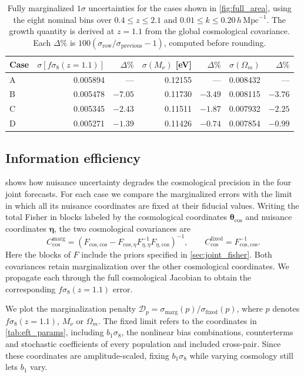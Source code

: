 \documentclass[a4paper,11pt]{article}
\newcommand{\revchange}[1]{{\color{RevisionColor}#1}}
\newcommand{\Om}{\Omega_m}
\def\iMpch{\,h\,\mathrm{Mpc}^{-1}}
\newcommand{\se}{\ensuremath{\sigma_{8}}\xspace}
\newcommand{\Mnu}{M_\nu}
\begin{document}
\begin{table}[t]
\centering\color{RevisionColor}
\small
\setlength{\tabcolsep}{5pt}
\begin{tabular}{lrrrrrr}
\hline
Case & $\sigma[f\se(z=1.1)]$ & $\Delta\%$ & $\sigma(\Mnu)$ [eV] & $\Delta\%$ & $\sigma(\Om)$ & $\Delta\%$ \\
\hline
A & 0.005894 & --- & 0.12155 & --- & 0.008432 & --- \\
B & 0.005478 & $-7.05$ & 0.11730 & $-3.49$ & 0.008115 & $-3.76$ \\
C & 0.005345 & $-2.43$ & 0.11511 & $-1.87$ & 0.007932 & $-2.25$ \\
D & 0.005271 & $-1.39$ & 0.11426 & $-0.74$ & 0.007854 & $-0.99$ \\
\hline
\end{tabular}
\caption{\color{RevisionColor}Fully marginalized $1\sigma$ uncertainties for the
cases shown in \cref{fig:full_area}, using the eight nominal
bins over $0.4\leq z\leq2.1$ and
$0.01\leq k\leq0.20\iMpch$. The growth quantity is derived
at $z=1.1$ from the global cosmological covariance.
Each $\Delta\%$ is $100(\sigma_{\mathrm{row}}/\sigma_{\mathrm{previous}}-1)$,
computed before rounding.}
\label{tab:headline}
\end{table}


\subsection{Information efficiency}
\label{sec:results_efficiency}

\revchange{ shows how nuisance uncertainty degrades
the cosmological precision in the four joint forecasts.
For each case we compare the marginalized errors with the
limit in which all its nuisance coordinates are fixed at
their fiducial values. Writing the total Fisher in blocks labeled by
the cosmological coordinates $\boldsymbol{\theta}_{\mathrm{cos}}$
and nuisance coordinates $\boldsymbol{\eta}$, the two
cosmological covariances are
\[
C_{\mathrm{cos}}^{\mathrm{marg}}
 =\left(F_{\mathrm{cos},\mathrm{cos}}
 -F_{\mathrm{cos},\eta}F_{\eta,\eta}^{-1}F_{\eta,\mathrm{cos}}\right)^{-1},
\qquad
C_{\mathrm{cos}}^{\mathrm{fixed}}=F_{\mathrm{cos},\mathrm{cos}}^{-1}.
\]
Here the blocks of $F$ include the priors specified in
\cref{sec:joint_fisher}. Both covariances
retain marginalization over the other cosmological
coordinates. We propagate each through the full
cosmological Jacobian to obtain the corresponding
$f\se(z=1.1)$ error.

We plot the marginalization penalty
$\mathcal D_p=\sigma_{\mathrm{marg}}(p)/\sigma_{\mathrm{fixed}}(p)$,
where $p$ denotes $f\se(z=1.1)$, $\Mnu$ or $\Om$.
The fixed limit refers to the coordinates in
\cref{tab:eft_params}, including $b_1\se$, the nonlinear
bias combinations, counterterms and stochastic coefficients
of every population and included cross-pair. Since these coordinates are amplitude-scaled, fixing $b_1\se$
while varying cosmology still lets $b_1$ vary.}
\end{document}
